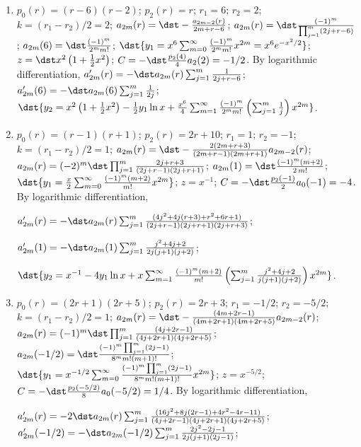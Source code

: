 \documentclass[openany]{book}
\newenvironment{sectionSolutions}{
 \begin{enumerate}[item-label={\thesection.\arabic{enumi}.}]
}{
 \end{enumerate}
}
\begin{document}
\begin{sectionSolutions}
\textbf{Note: in the solutions to Exercises~7.7.23--7.7.40,
$z=x^{r_2}\sum_{m=0}^{k-1}a_{2m}(r_2)x^{2m}$.}




\item
$p_0(r)=(r-6)(r-2)$;
$p_2(r)=r$;
$r_1=6$; $r_2=2$; $k=(r_1-r_2)/2=2$;
$a_{2m}(r)=\dst-\frac{a_{2m-2}(r)}{2m+r-6}
$;
 $a_{2m}(r)=\dst\frac{(-1)^m}{\prod_{j=1}^m(2j+r-6)}$;
$a_{2m}(6)=\dst\frac{(-1)^m}{2^mm!}$;
$\dst{y_1=x^6\sum_{m=0}^\infty\frac{(-1)^m}{2^mm!}x^{2m}=x^6e^{-x^2/2}}$;
$z=\dst x^2\left(1+\frac{1}{2}x^2\right)$;
$C=-\dst\frac{p_2(4)}{4}a_2(2)=-1/2$.
By logarithmic differentiation,
$a_{2m}'(r)=-\dst a_{2m}(r)\sum_{j=1}^m\frac{1}{2j+r-6}$;
$a_{2m}'(6)=-\dst a_{2m}(6)\sum_{j=1}^m\frac{1}{2j}$;
$\dst{y_2=x^2\left(1+\frac{1}{2}x^2\right)-\frac{1}{2}y_1\ln
x+\frac{x^6}{4}\sum_{m=1}^\infty\frac{(-1)^m}{2^mm!}\left(\sum_{j=1}^m
\frac{1}{ j}\right)x^{2m}}$.


\item
$p_0(r)=(r-1)(r+1)$;
$p_2(r)=2r+10$;
$r_1=1$; $r_2=-1$; $k=(r_1-r_2)/2=1$;
$a_{2m}(r)=\dst-\frac{2(2m+r+3)}{(2m+r-1)(2m+r+1)}a_{2m-2}(r)$;
 $a_{2m}(r)=(-2)^m\dst\prod_{j=1}^m\frac{2j+r+3}{(2j+r-1)(2j+r+1)}$;
$a_{2m}(1)=\dst\frac{(-1)^m(m+2)}{2\, m!}$;
$\dst{y_1=\frac{x}{2}\sum_{m=0}^\infty\frac{(-1)^m(m+2)}{ m!}x^{2m}}$;
$z=x^{-1}$;
$C=-\dst\frac{p_2(-1)}{ 2}a_0(-1)=-4$.
By logarithmic differentiation,

$a_{2m}'(r)=-\dst a_{2m}(r)\sum_{j=1}^m
\frac{(4j^2+4j(r+3)+r^2+6r+1)}{(2j+r-1)(2j+r+1)(2j+r+3)}$;

$a_{2m}'(1)=-\dst a_{2m}(1)\sum_{j=1}^m\frac{j^2+4j+2}{2j(j+1)(j+2)}$;

$\dst{y_2=x^{-1}-4y_1\ln x+x\sum_{m=1}^\infty\frac{(-1)^m(m+2)}{
m!}\left(\sum_{j=1}^m\frac{j^2+4j+2}{ j(j+1)(j+2)} \right)x^{2m}}$.




\item
$p_0(r)=(2r+1)(2r+5)$;
$p_2(r)=2r+3$;
$r_1=-1/2$; $r_2=-5/2$; $k=(r_1-r_2)/2=1$;
$a_{2m}(r)=\dst-\frac{(4m+2r-1)}{(4m+2r+1)(4m+2r+5)}a_{2m-2}(r)$;
$a_{2m}(r)=(-1)^m\dst\prod_{j=1}^m\frac{(4j+2r-1)}{(4j+2r+1)(4j+2r+5)}$;
$a_{2m}(-1/2)=\dst\frac{(-1)^m\prod_{j=1}^m(2j-1)}{8^mm!(m+1)!}$;
$\dst{y_1=x^{-1/2}\sum_{m=0}^\infty
\frac{(-1)^m\prod_{j=1}^m(2j-1)}{8^mm!(m+1)!}
x^{2m}}$;
$z=x^{-5/2}$;
$C=-\dst\frac{p_2(-5/2)}{8}a_0(-5/2)=1/4$.
By logarithmic differentiation,

$a_{2m}'(r)=-2\dst a_{2m}(r)\sum_{j=1}^m
\frac{(16j^2+8j(2r-1)+4r^2-4r-11)}{(4j+2r-1)(4j+2r+1)(4j+2r+5)}$;
$a_{2m}'(-1/2)=-\dst a_{2m}(-1/2)\sum_{j=1}^m\frac{2j^2-2j-1}{
2j(j+1)(2j-1)}$;


\end{sectionSolutions}
\end{document}
